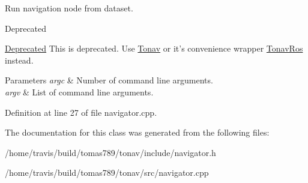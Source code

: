 Run navigation node from dataset. 

\begin{DoxyRefDesc}{Deprecated}
\item[\hyperlink{deprecated__deprecated000004}{Deprecated}]This is deprecated. Use \hyperlink{class_tonav}{Tonav} or it's convenience wrapper \hyperlink{class_tonav_ros}{Tonav\-Ros} instead.\end{DoxyRefDesc}



\begin{DoxyParams}{Parameters}
{\em argc} & Number of command line arguments. \\
\hline
{\em argv} & List of command line arguments. \\
\hline
\end{DoxyParams}


Definition at line 27 of file navigator.\-cpp.



The documentation for this class was generated from the following files\-:\begin{DoxyCompactItemize}
\item 
/home/travis/build/tomas789/tonav/include/navigator.\-h\item 
/home/travis/build/tomas789/tonav/src/navigator.\-cpp\end{DoxyCompactItemize}
